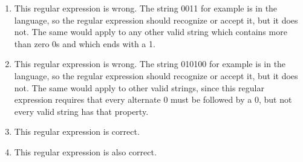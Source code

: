 \documentclass[11pt]{article}
\begin{document}
\begin{enumerate}
\begin{enumerate}
            \item This regular expression is wrong.  The string 0011 for
                  example is in the language, so the regular expression
                  should recognize or accept it, but it does not.  The same
                  would apply to any other valid string which contains more
                  than zero 0s and which ends with a 1.

            \item This regular expression is wrong.  The string 010100 for
                  example is in the language, so the regular expression
                  should recognize or accept it, but it does not.  The same
                  would apply to other valid strings, since this regular
                  expression requires that every alternate 0 must be
                  followed by a 0, but not every valid string has that
                  property.

            \item This regular expression is correct.

            \item This regular expression is also correct.

          \end{enumerate}

  \end{enumerate}
\end{document}
